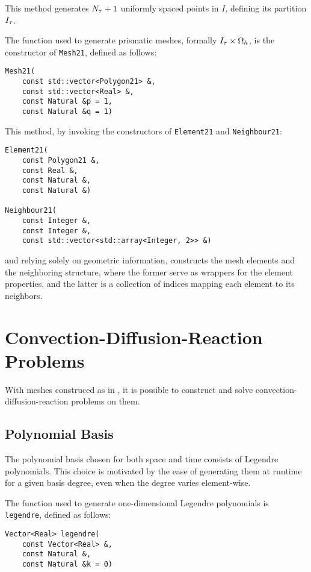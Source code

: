 This method generates $N_{\tau} + 1$ uniformly spaced points in $I$, defining its partition $I_{\tau}$.

The function used to generate prismatic meshes, formally $I_{\tau} \times \Omega_{h}$, is the constructor of \lstinline{Mesh21}, defined as follows:
\begin{lstlisting}[style=cpp]
Mesh21(
    const std::vector<Polygon21> &, 
    const std::vector<Real> &, 
    const Natural &p = 1, 
    const Natural &q = 1)
\end{lstlisting}

This method, by invoking the constructors of \lstinline{Element21} and \lstinline{Neighbour21}:
\begin{lstlisting}[style=cpp]
Element21(
    const Polygon21 &, 
    const Real &, 
    const Natural &, 
    const Natural &)

Neighbour21(
    const Integer &, 
    const Integer &, 
    const std::vector<std::array<Integer, 2>> &)
\end{lstlisting}
and relying solely on geometric information, constructs the mesh elements and the neighboring structure, where the former serve as wrappers for the element properties, and the latter is a collection of indices mapping each element to its neighbors.

\newpage
\section{Convection-Diffusion-Reaction Problems}

With meshes construced as in , it is possible to construct and solve convection-diffusion-reaction problems on them.

\subsection{Polynomial Basis}

The polynomial basis chosen for both space and time consists of Legendre polynomials. This choice is motivated by the ease of generating them at runtime for a given basis degree, even when the degree varies element-wise.

The function used to generate one-dimensional Legendre polynomials is \lstinline{legendre}, defined as follows:
\begin{lstlisting}[style=cpp]
Vector<Real> legendre(
    const Vector<Real> &, 
    const Natural &, 
    const Natural &k = 0)
\end{lstlisting}

